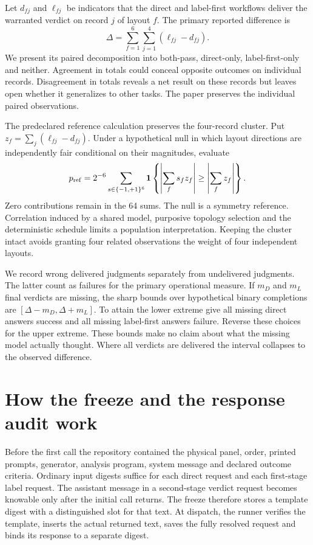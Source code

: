 \documentclass[12pt,letterpaper]{article}
\begin{document}
Let $d_{fj}$ and $\ell_{fj}$ be indicators that the direct and label-first workflows deliver the warranted verdict on record $j$ of layout $f$. The primary reported difference is
\[
 \Delta=\sum_{f=1}^6\sum_{j=1}^4(\ell_{fj}-d_{fj}).
\]
We present its paired decomposition into both-pass, direct-only, label-first-only and neither. Agreement in totals could conceal opposite outcomes on individual records. Disagreement in totals reveals a net result on these records but leaves open whether it generalizes to other tasks. The paper preserves the individual paired observations.

The predeclared reference calculation preserves the four-record cluster. Put $z_f=\sum_j(\ell_{fj}-d_{fj})$. Under a hypothetical null in which layout directions are independently fair conditional on their magnitudes, evaluate
\[
 p_{\rm ref}=2^{-6}\sum_{s\in\{-1,+1\}^6}
 \mathbf{1}\left\{\left|\sum_f s_fz_f\right|\geq
 \left|\sum_f z_f\right|\right\}.
\]
Zero contributions remain in the 64 sums. The null is a symmetry reference. Correlation induced by a shared model, purposive topology selection and the deterministic schedule limits a population interpretation. Keeping the cluster intact avoids granting four related observations the weight of four independent layouts.

We record wrong delivered judgments separately from undelivered judgments. The latter count as failures for the primary operational measure. If $m_D$ and $m_L$ final verdicts are missing, the sharp bounds over hypothetical binary completions are $[\Delta-m_D,\Delta+m_L]$. To attain the lower extreme give all missing direct answers success and all missing label-first answers failure. Reverse these choices for the upper extreme. These bounds make no claim about what the missing model actually thought. Where all verdicts are delivered the interval collapses to the observed difference.

\section{How the freeze and the response audit work}
Before the first call the repository contained the physical panel, order, printed prompts, generator, analysis program, system message and declared outcome criteria. Ordinary input digests suffice for each direct request and each first-stage label request. The assistant message in a second-stage verdict request becomes knowable only after the initial call returns. The freeze therefore stores a template digest with a distinguished slot for that text. At dispatch, the runner verifies the template, inserts the actual returned text, saves the fully resolved request and binds its response to a separate digest.
\end{document}
